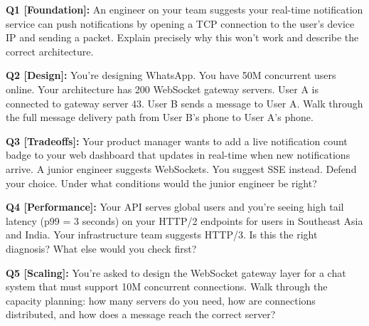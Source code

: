 \documentclass[11pt,a4paper]{article}
\begin{document}
\begin{quizbox}
\textbf{Q1 [Foundation]:} An engineer on your team suggests your real-time notification service can push notifications by opening a TCP connection to the user's device IP and sending a packet. Explain precisely why this won't work and describe the correct architecture.

\vspace{10pt}

\textbf{Q2 [Design]:} You're designing WhatsApp. You have 50M concurrent users online. Your architecture has 200 WebSocket gateway servers. User A is connected to gateway server 43. User B sends a message to User A. Walk through the full message delivery path from User B's phone to User A's phone.

\vspace{10pt}

\textbf{Q3 [Tradeoffs]:} Your product manager wants to add a live notification count badge to your web dashboard that updates in real-time when new notifications arrive. A junior engineer suggests WebSockets. You suggest SSE instead. Defend your choice. Under what conditions would the junior engineer be right?

\vspace{10pt}

\textbf{Q4 [Performance]:} Your API serves global users and you're seeing high tail latency (p99 = 3 seconds) on your HTTP/2 endpoints for users in Southeast Asia and India. Your infrastructure team suggests HTTP/3. Is this the right diagnosis? What else would you check first?

\vspace{10pt}

\textbf{Q5 [Scaling]:} You're asked to design the WebSocket gateway layer for a chat system that must support 10M concurrent connections. Walk through the capacity planning: how many servers do you need, how are connections distributed, and how does a message reach the correct server?
\end{quizbox}
\end{document}
